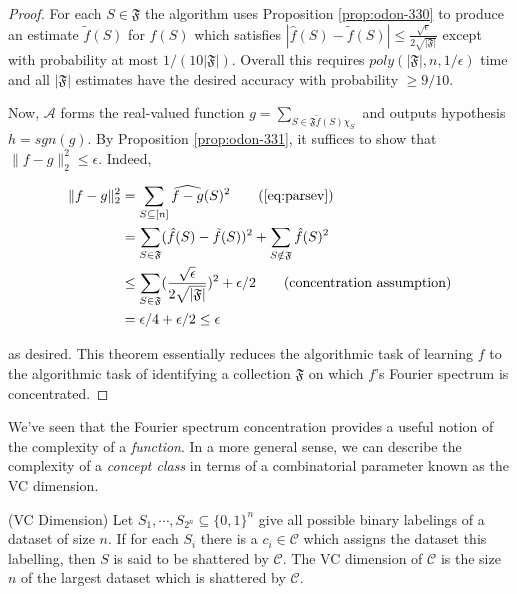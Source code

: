 \documentclass[main.tex]{subfiles}
\begin{document}
\begin{proof}
For each $S \in \mathfrak{F}$ the algorithm uses Proposition \ref{prop:odon-330} to produce an estimate $\tilde{f}(S)$ for $\hat{f}(S)$ which satisfies $|\hat{f}(S) - \tilde{f}(S) | \leq \frac{\sqrt{\epsilon}}{2 \sqrt{|\mathfrak{F}|}}$ except with probability at most $1/(10|\mathfrak{F}|)$. Overall this requires $poly(|\mathfrak{F}|, n, 1/\epsilon)$ time and all $|\mathfrak{F}|$ estimates have the desired accuracy with probability $\geq 9/10$. 

Now, $\mathcal{A}$ forms the real-valued function $g = \sum_{S \in \mathfrak{F} \tilde{f}(S) \chi_S}$ and outputs hypothesis $h = sgn(g)$. By Proposition \ref{prop:odon-331}, it suffices to show that $\| f - g\|_2^2 \leq \epsilon$. Indeed,

\begin{align*}
	\| f - g\|_2^2 &= \sum_{S \subseteq [n]}\widehat{f - g}(S)^2 \tag{\ref{eq:parsev}} \\
	&= \sum_{S \in \mathfrak{F}}(\hat{f}(S) - \tilde{f}(S))^2 + \sum_{S \notin \mathfrak{F}}\hat{f}(S)^2 \\
	&\leq \sum_{S \in \mathfrak{F}} (\frac{\sqrt{\epsilon}}{2\sqrt{|\mathfrak{F}|}})^2 + \epsilon /2 \tag{concentration assumption} \\
	&= \epsilon /4 + \epsilon/2 \leq \epsilon
\end{align*}

as desired. This theorem essentially reduces the algorithmic task of learning $f$ to the algorithmic task of identifying a collection $\mathfrak{F}$ on which $f$'s Fourier spectrum is concentrated. 
\end{proof}

We've seen that the Fourier spectrum concentration provides a useful notion of the complexity of a \textit{function}. In a more general sense, we can describe the complexity of a \textit{concept class} in terms of a combinatorial parameter known as the VC dimension.

\begin{definition}
\label{def:vc-dim}
(VC Dimension) Let $S_1, \cdots, S_{2^n} \subseteq \{0, 1\}^n$ give all possible binary labelings of a dataset of size $n$. If for each $S_i$ there is a $c_i \in \mathcal{C}$ which assigns the dataset this labelling, then $S$ is said to be shattered by $\mathcal{C}$. The VC dimension of $\mathcal{C}$ is the size $n$ of the largest dataset which is shattered by $\mathcal{C}$.
\end{definition}
\end{document}
